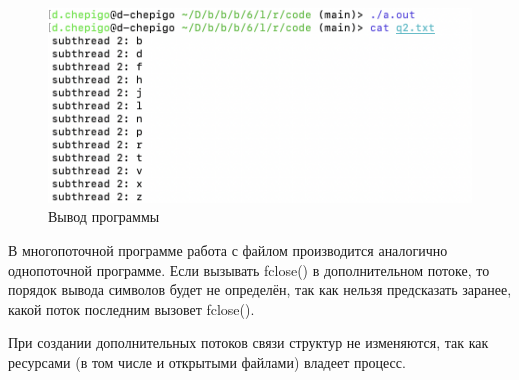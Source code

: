 \clearpage

\begin{figure}[h]
	\centering
	\includegraphics[width=\textwidth]{image/22-2}
	\caption{Вывод программы}
\end{figure}

В многопоточной программе работа с файлом производится аналогично однопоточной программе. Если вызывать fclose() в дополнительном потоке, то порядок вывода символов будет не определён, так как нельзя предсказать заранее, какой поток последним вызовет fclose().

При создании дополнительных потоков связи структур не изменяются, так как ресурсами (в том числе и открытыми файлами) владеет процесс.
